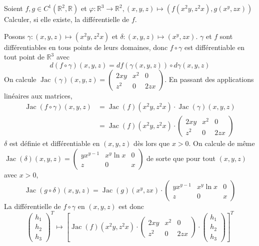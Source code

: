 \documentclass{fancybook}
\begin{document}
\begin{exercice}
Soient $f,g\in C^1(\mathbb R^2,\mathbb R)$ et $\varphi: \mathbb R^3\to \mathbb R^2, (x,y,z)\mapsto (f(x^2y,z^2x),g(x^y,zx))$\newline
Calculer, si elle existe, la différentielle de $f$.
\end{exercice}
Posons $\gamma:(x,y,z)\mapsto (x^2y,z^2x)$ et $\delta:(x,y,z)\mapsto (x^y,zx)$.\newline
$\gamma$ et $f$ sont différentiables en tous points de leurs domaines, donc $f\circ \gamma$ est différentiable en tout point de $\mathbb R^3$ avec $$d(f\circ \gamma)(x,y,z) = df(\gamma(x,y,z))\circ d\gamma(x,y,z)$$
On calcule $\operatorname{Jac}(\gamma)(x,y,z)=\begin{pmatrix}
2xy & x^2 & 0 \\
z^2 & 0 & 2zx
\end{pmatrix}$.
En passant des applications linéaires aux matrices, $$\begin{aligned} \operatorname{Jac}(f\circ \gamma)(x,y,z) &= \operatorname{Jac}(f)(x^2y,z^2x)\cdot \operatorname{Jac}(\gamma)(x,y,z)\\
&= \operatorname{Jac}(f)(x^2y,z^2x) \cdot  \begin{pmatrix}
2xy & x^2 & 0 \\
z^2 & 0 & 2zx
\end{pmatrix} \end{aligned}$$\newline
$\delta$ est définie et différentiable en $(x,y,z)$ dès lors que $x>0$. On calcule de même $\operatorname{Jac}(\delta)(x,y,z)=\begin{pmatrix}
yx^{y-1} & x^y\ln x & 0 \\
z & 0 & x
\end{pmatrix}$ de sorte que pour tout $(x,y,z)$ avec $x>0$, $$ \operatorname{Jac}(g\circ \delta)(x,y,z)= \operatorname{Jac}(g)(x^y,zx) \cdot \begin{pmatrix}
yx^{y-1} & x^y\ln x & 0 \\
z & 0 & x
\end{pmatrix}$$
La différentielle de $f\circ \gamma$ en $(x,y,z)$ est donc $$\begin{pmatrix}
h_1 \\
h_2 \\
h_3
\end{pmatrix}^T \mapsto \left[\operatorname{Jac}(f)(x^2y,z^2x) \cdot  \begin{pmatrix}
2xy & x^2 & 0 \\
z^2 & 0 & 2zx
\end{pmatrix}\cdot \begin{pmatrix}
h_1 \\
h_2 \\
h_3
\end{pmatrix}\right]^T$$
\end{document}
